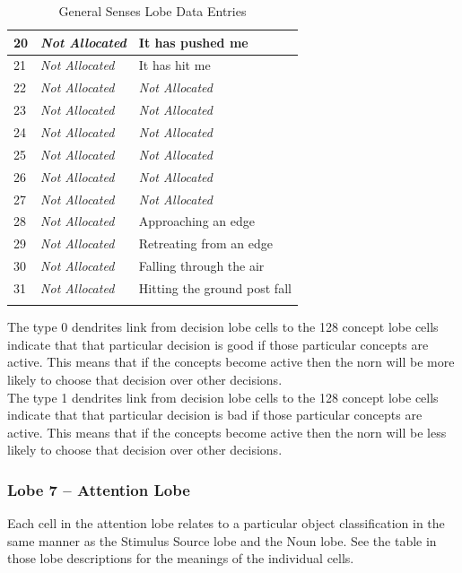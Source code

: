 \documentclass[11pt,twoside,a4paper]{article}
\begin{document}
\begin{longtable}{|p{}|p{}|p{}|}
20	&	\emph{Not Allocated}	&	It has pushed me	 \\ \hline
21	&	\emph{Not Allocated}	&	It has hit me		 \\ \hline
22	&	\emph{Not Allocated}	&	\emph{Not Allocated}	 \\ \hline
23	&	\emph{Not Allocated}	&	\emph{Not Allocated}	 \\ \hline
24	&	\emph{Not Allocated}	&	\emph{Not Allocated}	 \\ \hline
25	&	\emph{Not Allocated}	&	\emph{Not Allocated}	 \\ \hline
26	&	\emph{Not Allocated}	&	\emph{Not Allocated}	 \\ \hline
27	&	\emph{Not Allocated}	&	\emph{Not Allocated}	 \\ \hline
28	&	\emph{Not Allocated}	&	Approaching an edge	 \\ \hline
29	&	\emph{Not Allocated}	&	Retreating from an edge	 \\ \hline
30	&	\emph{Not Allocated}	&	Falling through the air	 \\ \hline
31	&	\emph{Not Allocated}	&	Hitting the ground post fall	 \\ \hline
	\caption{General Senses Lobe Data Entries }
	\label{tab:General_Senses_Lobe_Data_Entries}\\
\end{longtable}

\clearpage

The type 0 dendrites link from decision lobe cells to the 128 concept lobe cells indicate that that particular decision is good if those particular concepts are active. This means that if the concepts become active then the norn will be more likely to choose that decision over other decisions.~\\

The type 1 dendrites link from decision lobe cells to the 128 concept lobe cells indicate that that particular decision is bad if those particular concepts are active. This means that if the concepts become active then the norn will be less likely to choose that decision over other decisions.


\subsubsection{Lobe 7 -- Attention Lobe}

Each cell in the attention lobe relates to a particular object classification in the same manner as the Stimulus Source lobe and the Noun lobe. See the table in those lobe descriptions for the meanings of the individual cells.~\\
\end{document}
